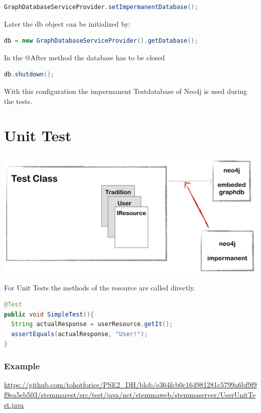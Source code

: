 \documentclass[11pt,fleqn,openany]{book} %
\begin{document}
\begin{lstlisting}[language=java]
    GraphDatabaseServiceProvider.setImpermanentDatabase();
\end{lstlisting}
Later the db object can be initialized by:
\begin{lstlisting}[language=java]
    db = new GraphDatabaseServiceProvider().getDatabase();
\end{lstlisting}
In the @After method the database has to be closed
\begin{lstlisting}[language=java]
    db.shutdown();
\end{lstlisting}
With this configuration the impermanent Testdatabase of Neo4j is used during the tests. 


\chapter{Unit Test}

\begin{center}
\includegraphics[scale=.4]{Pictures/junitoverview.png}
\end{center} 
 
For Unit Tests the methods of the resource are called directly.
\begin{lstlisting}[language=java]
@Test
public void SimpleTest(){
  String actualResponse = userResource.getIt();
  assertEquals(actualResponse, "User!");
}
\end{lstlisting}


\subsection*{Example}
\url{https://github.com/tohotforice/PSE2_DH/blob/e364fcb0c164981281c5799a6bf9f9f9ea5eb503/stemmarest/src/test/java/net/stemmaweb/stemmaserver/UserUnitTest.java}
\end{document}
